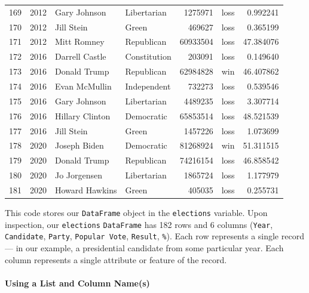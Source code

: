 \documentclass[
  letterpaper,
  DIV=11,
  numbers=noendperiod]{scrreprt}
\let\oldparagraph\paragraph
\renewcommand{\paragraph}[1]{\oldparagraph{#1}\mbox{}}
\begin{document}
\begin{tabular}{lrllrlr}
169 &  2012 &            Gary Johnson &            Libertarian &       1275971 &   loss &   0.992241 \\
170 &  2012 &              Jill Stein &                  Green &        469627 &   loss &   0.365199 \\
171 &  2012 &             Mitt Romney &             Republican &      60933504 &   loss &  47.384076 \\
172 &  2016 &          Darrell Castle &           Constitution &        203091 &   loss &   0.149640 \\
173 &  2016 &            Donald Trump &             Republican &      62984828 &    win &  46.407862 \\
174 &  2016 &           Evan McMullin &            Independent &        732273 &   loss &   0.539546 \\
175 &  2016 &            Gary Johnson &            Libertarian &       4489235 &   loss &   3.307714 \\
176 &  2016 &         Hillary Clinton &             Democratic &      65853514 &   loss &  48.521539 \\
177 &  2016 &              Jill Stein &                  Green &       1457226 &   loss &   1.073699 \\
178 &  2020 &            Joseph Biden &             Democratic &      81268924 &    win &  51.311515 \\
179 &  2020 &            Donald Trump &             Republican &      74216154 &   loss &  46.858542 \\
180 &  2020 &            Jo Jorgensen &            Libertarian &       1865724 &   loss &   1.177979 \\
181 &  2020 &          Howard Hawkins &                  Green &        405035 &   loss &   0.255731 \\
\bottomrule
\end{tabular}

This code stores our \texttt{DataFrame} object in the \texttt{elections}
variable. Upon inspection, our \texttt{elections} \texttt{DataFrame} has
182 rows and 6 columns (\texttt{Year}, \texttt{Candidate},
\texttt{Party}, \texttt{Popular\ Vote}, \texttt{Result}, \texttt{\%}).
Each row represents a single record --- in our example, a presidential
candidate from some particular year. Each column represents a single
attribute or feature of the record.

\hypertarget{using-a-list-and-column-names}{%
\paragraph{Using a List and Column
Name(s)}\label{using-a-list-and-column-names}}
\end{document}
